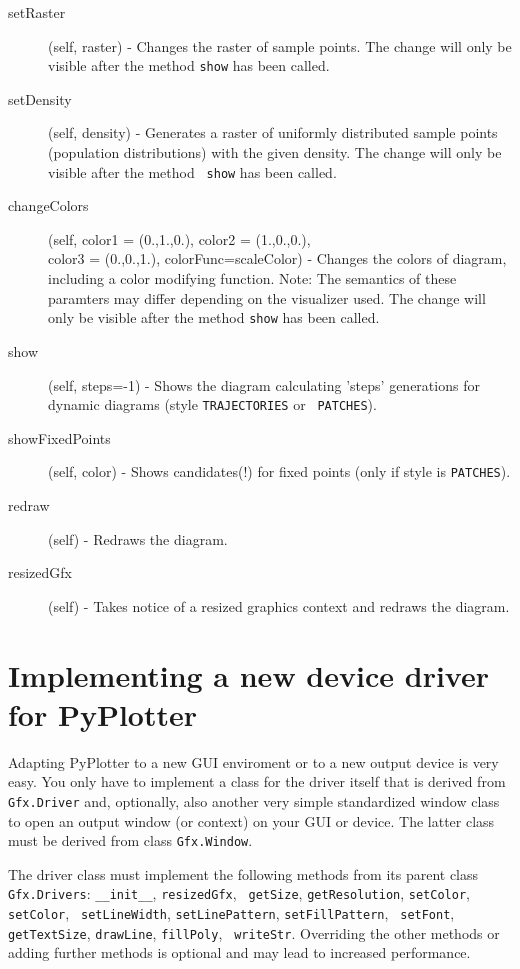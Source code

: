 \documentclass[12pt,a4paper,USenglish]{article}
\begin{document}
\begin{description}
\item[setRaster] (self, raster) - Changes the raster of sample points.
  The change will only be visible after the method {\tt show} has been
  called.

\item[setDensity] (self, density) - Generates a raster of uniformly
  distributed sample points (population distributions) with the given
  density.  The change will only be visible after the method {\tt
    show} has been called.

\item[changeColors] (self, color1 = (0.,1.,0.), color2 = (1.,0.,0.),\\
  color3 = (0.,0.,1.), colorFunc=scaleColor) - Changes the colors of
  diagram, including a color modifying function. Note: The semantics
  of these paramters may differ depending on the visualizer used.  The
  change will only be visible after the method {\tt show} has been
  called.

\item[show] (self, steps=-1) - Shows the diagram calculating 'steps'
  generations for dynamic diagrams (style {\tt TRAJECTORIES} or {\tt
    PATCHES}).

\item[showFixedPoints] (self, color) - Shows candidates(!) for fixed
  points (only if style is {\tt PATCHES}).
        
\item[redraw] (self) - Redraws the diagram.

\item[resizedGfx] (self) - Takes notice of a resized graphics context
  and redraws the diagram.

\end{description}

\section{Implementing a new device driver for PyPlotter} 

Adapting {\sf PyPlotter} to a new GUI enviroment or to a new output
device is very easy. You only have to implement a class for the driver itself
that is derived from {\tt Gfx.Driver} and, optionally, also 
another very simple
standardized window class to open an output window (or context) on your 
GUI or device. The latter class
must be derived from class {\tt Gfx.Window}.

The driver class must implement the following methods from its parent
class {\tt Gfx.Drivers}: {\tt \_\_init\_\_}, {\tt resizedGfx}, {\tt
getSize}, {\tt getResolution}, {\tt setColor}, {\tt setColor}, {\tt
setLineWidth}, {\tt setLinePattern}, {\tt setFillPattern}, {\tt
setFont}, {\tt getTextSize}, {\tt drawLine}, {\tt fillPoly}, {\tt
writeStr}. Overriding the other methods or adding further methods is
optional and may lead to increased performance.
\end{document}
